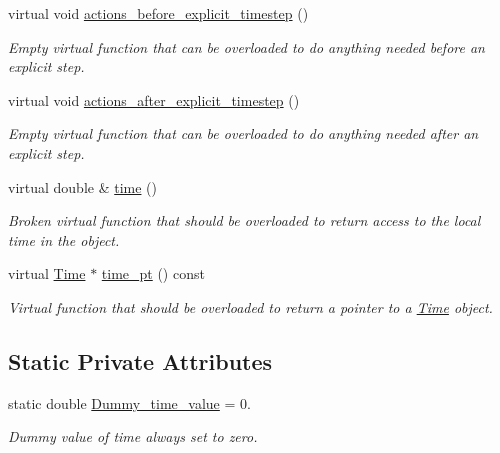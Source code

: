 \begin{DoxyCompactItemize}
virtual void \hyperlink{classoomph_1_1ExplicitTimeSteppableObject_ae169b713aa971921bfd1269de898b934}{actions\+\_\+before\+\_\+explicit\+\_\+timestep} ()
\begin{DoxyCompactList}\small\item\em Empty virtual function that can be overloaded to do anything needed before an explicit step. \end{DoxyCompactList}\item 
virtual void \hyperlink{classoomph_1_1ExplicitTimeSteppableObject_a22371b17397f74660c8e9d54ed50ccea}{actions\+\_\+after\+\_\+explicit\+\_\+timestep} ()
\begin{DoxyCompactList}\small\item\em Empty virtual function that can be overloaded to do anything needed after an explicit step. \end{DoxyCompactList}\item 
virtual double \& \hyperlink{classoomph_1_1ExplicitTimeSteppableObject_a42fde674301963f01b8e41b3f333cc65}{time} ()
\begin{DoxyCompactList}\small\item\em Broken virtual function that should be overloaded to return access to the local time in the object. \end{DoxyCompactList}\item 
virtual \hyperlink{classoomph_1_1Time}{Time} $\ast$ \hyperlink{classoomph_1_1ExplicitTimeSteppableObject_a49ecd5e667dc16d4f2b991598d311b36}{time\+\_\+pt} () const
\begin{DoxyCompactList}\small\item\em Virtual function that should be overloaded to return a pointer to a \hyperlink{classoomph_1_1Time}{Time} object. \end{DoxyCompactList}\end{DoxyCompactItemize}
\subsection*{Static Private Attributes}
\begin{DoxyCompactItemize}
\item 
static double \hyperlink{classoomph_1_1ExplicitTimeSteppableObject_ae16e2f717ed0e72c2c543745f8716252}{Dummy\+\_\+time\+\_\+value} = 0.
\begin{DoxyCompactList}\small\item\em Dummy value of time always set to zero. \end{DoxyCompactList}\end{DoxyCompactItemize}


